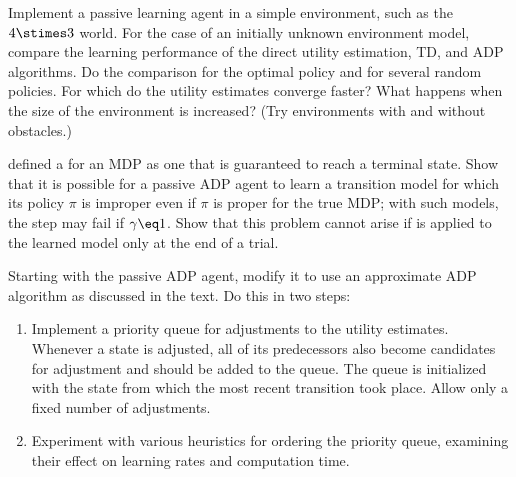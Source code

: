 
\begin{exercise}
\prgex
Implement a passive learning agent in a simple environment, such as
the \(4\stimes 3\) world. For the case of an
initially unknown environment model, compare the learning performance
of the direct utility estimation, TD, and ADP algorithms.
Do the comparison for the optimal policy and for several random policies.
For which do the utility estimates converge faster?
What happens when the size of the environment is increased?
(Try environments with and without obstacles.)
\end{exercise} 

\begin{uexercise}
 defined a  for
an MDP as one that is guaranteed to reach a terminal state.  Show that
it is possible for a passive ADP agent to learn a transition model for
which its policy \(\pi\) is improper even if \(\pi\) is proper for the
true MDP; with such models, the  step may fail if
\(\gamma\eq 1\). Show that this problem cannot arise if 
is applied to the learned model only at the end of a
trial.
\end{uexercise} 

\begin{exercise}%
\prgex
Starting with the passive ADP agent, modify it to use an approximate
ADP algorithm as discussed in the text. Do this in two steps:
\begin{enumerate}
\item Implement a priority queue for adjustments to the utility
estimates. Whenever a state is adjusted, all of its predecessors also
become candidates for adjustment and should be added to the queue.
The queue is initialized with the state from which the most recent
transition took place.  Allow only a fixed
number of adjustments.
\item Experiment with various heuristics for ordering the priority
queue, examining their effect on learning rates and computation time.
\end{enumerate}
\end{exercise} 

